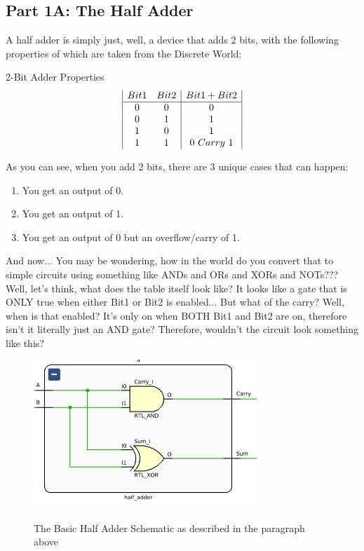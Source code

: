 \documentclass{article}
\begin{document}
\subsection{Part 1A: The Half Adder}
\qquad
A half adder is simply just, well, a device that adds 2 bits, with the following properties of which are taken from the Discrete World:
\begin{center}
    2-Bit Adder Properties
    \begin{displaymath}
    \begin{array}{|c c|c|}
    Bit1 & Bit2 & Bit1 + Bit2\\
    \hline
    0 & 0 & 0\\
    0 & 1 & 1\\
    1 & 0 & 1\\
    1 & 1 & 0\ Carry\ 1\\
    \end{array}
    \end{displaymath}
\end{center}

As you can see, when you add 2 bits, there are 3 unique cases that can happen:
\begin{enumerate}
      \item You get an output of 0.
      \item You get an output of 1.
      \item You get an output of 0 but an overflow/carry of 1.
\end{enumerate}

And now... You may be wondering, how in the world do you convert that to simple circuits using something like ANDs and ORs and XORs and NOTs??? Well, let's think, what does the table itself look like? It looks like a gate that is ONLY true when either Bit1 or Bit2 is enabled...
But what of the carry? Well, when is that enabled? It's only on when BOTH Bit1 and Bit2 are on, therefore isn't it literally just an AND gate? Therefore, wouldn't the circuit look something like this?
\begin{figure}[!htbp]
    \centering
    \caption{The Basic Half Adder Schematic as described in the paragraph above}
    \includegraphics[width=0.75\textwidth]{pictures/part1/basic_half_adder.png}
    \label{Basic 2-Bit Adder}
\end{figure}
\end{document}
